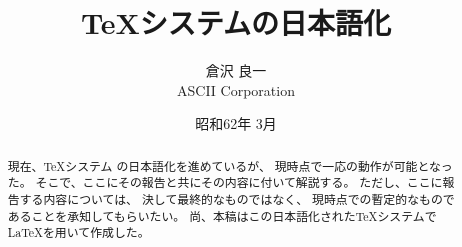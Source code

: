 \newcommand{\cs}[1]{{$\backslash$#1}}
\addtolength{\textheight}{.5in}
\addtolength{\textwidth}{.7in}
\setlength{\oddsidemargin}{.4in}
\setlength{\evensidemargin}{.4in}
\title{\TeX システムの日本語化}
\author{倉沢 良一\\ASCII Corporation}
\date{昭和62年 3月}
\pagestyle{headings}

\maketitle
\begin{abstract}
現在、\TeX システム の日本語化を進めているが、
現時点で一応の動作が可能となった。
そこで、ここにその報告と共にその内容に付いて解説する。
ただし、ここに報告する内容については、
決して最終的なものではなく、
現時点での暫定的なものであることを承知してもらいたい。
尚、本稿はこの日本語化された\TeX システムで\LaTeX を用いて作成した。
\end{abstract}
%
\newpage
\tableofcontents
\newpage
%
